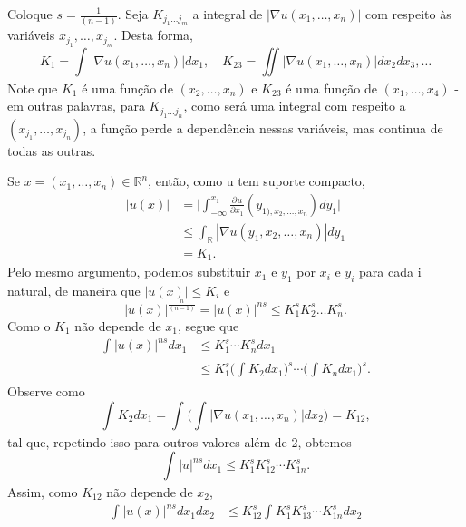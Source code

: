 \documentclass[measure_theory.tex]{subfiles}
\begin{document}
\begin{proof*}
	Coloque \(s=\frac{1}{(n-1)}\). Seja \(K_{j_{1}\dotsc j_{m}}\) a integral de \(|\nabla u(x_{1}, \dotsc , x_{n})|\) com respeito às variáveis \(x_{j_{1}}, \dotsc , x_{j_m}\). Desta forma,
	\[
		K_{1}=\int_{}^{}|\nabla u(x_{1}, \dotsc , x_{n})|dx_{1},\quad K_{23}=\iint_{}|\nabla u(x_{1}, \dotsc , x_{n})| dx_{2}dx_{3}, \dotsc
	\]
	Note que \(K_{1}\) é uma função de \((x_{2}, \dotsc , x_{n})\) e \(K_{23}\) é uma função de \((x_{1}, \dotsc , x_{4})\) - em outras palavras, para \(K_{j_{1}\dotsc j_{n}}\), como será uma integral com respeito a \((x_{j_1},\dotsc , x_{j_{n}})\), a função perde a dependência nessas variáveis, mas continua de todas as outras.

	Se \(x=(x_{1},\dotsc ,x_{n})\in \mathbb{R}^{n}\), então, como u tem suporte compacto,
	\begin{align*}
		|u(x)| & =\biggl\vert \int_{-\infty}^{x_{1}}\frac{\partial^{}u}{\partial x_{1}^{}}(y_{1), x_{2}, \dotsc , x_{n}})dy_{1} \biggr\vert \\
		       & \leq \int_{\mathbb{R}}^{}|\nabla u(y_{1}, x_{2}, \dotsc , x_{n})|dy_{1}                                                    \\
		       & =K_{1}.
	\end{align*}
	Pelo mesmo argumento, podemos substituir \(x_{1}\) e \(y_{1}\) por \(x_{i}\) e \(y_{i}\) para cada i natural, de maneira que \(|u(x)|\leq K_{i}\) e
	\[
		|u(x)|^{\frac{n}{(n-1)}}=|u(x)|^{ns}\leq K_{1}^{s}K_{2}^{s}\dotsc K_{n}^{s}.
	\]
	Como o \(K_{1}\) não depende de \(x_{1}\), segue que
	\begin{align*}
		\int_{}^{}|u(x)|^{ns}dx_{1} & \leq K_{1}^{s}\cdots K_{n}^{s}dx_{1}                                                                 \\
		                            & \leq K_{1}^{s}\biggl(\int_{}^{}K_{2}dx_{1}\biggr)^{s}\cdots \biggl(\int_{}^{}K_{n}dx_{1}\biggr)^{s}.
	\end{align*}
	Observe como
	\[
		\int_{}^{}K_{2}dx_{1}=\int_{}^{}\biggl(\int_{}^{}|\nabla u(x_{1}, \dotsc , x_{n})|dx_{2}\biggr) = K_{12},
	\]
	tal que, repetindo isso para outros valores além de 2, obtemos
	\[
		\int_{}^{}|u|^{ns}dx_{1}\leq K_{1}^{s}K_{12}^{s}\cdots K_{1n}^{s}.
	\]
	Assim, como \(K_{12}\) não depende de \(x_{2}\),
	\begin{align*}
		\int_{}^{}|u(x)|^{ns}dx_{1}dx_{2} & \leq K_{12}^{s}\int_{}^{}K_{1}^{s}K_{13}^{s}\cdots K_{1n}^{s}dx_{2}                                                                                                                           \\

\end{align*}
\end{proof*}
\end{document}
